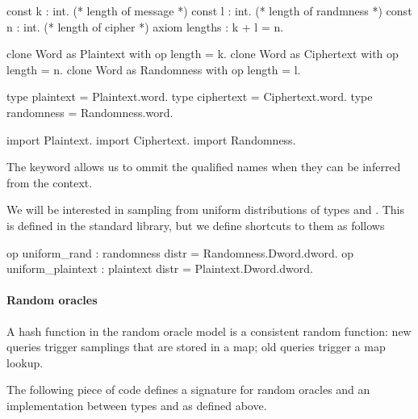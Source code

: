 \begin{easycrypt}[label={lst:word}]{}
const k : int. (* length of message *)
const l : int. (* length of randmness *)
const n : int. (* length of cipher *)
axiom lengths : k + l = n.

clone Word as Plaintext with op length = k.
clone Word as Ciphertext with op length = n.
clone Word as Randomness with op length = l.

type plaintext = Plaintext.word.
type ciphertext = Ciphertext.word.
type randomness = Randomness.word.

import Plaintext.
import Ciphertext.
import Randomness.
\end{easycrypt}

The  keyword allows us to ommit the qualified names when
they can be inferred from the context. 

We will be interested in sampling from uniform distributions of types
 and . This is defined in the standard
library, but we define shortcuts to them as follows

\begin{easycrypt}[label={lst:samplebs}]{}
op uniform_rand : randomness distr = Randomness.Dword.dword.
op uniform_plaintext : plaintext distr = Plaintext.Dword.dword.
\end{easycrypt}

\paragraph{Random oracles}
A hash function in the random oracle model is a consistent random
function: new queries trigger samplings that are stored in a map; old
queries trigger a map lookup. 

The following piece of code defines a signature for random oracles and
an implementation between  types  and
 as defined above.


